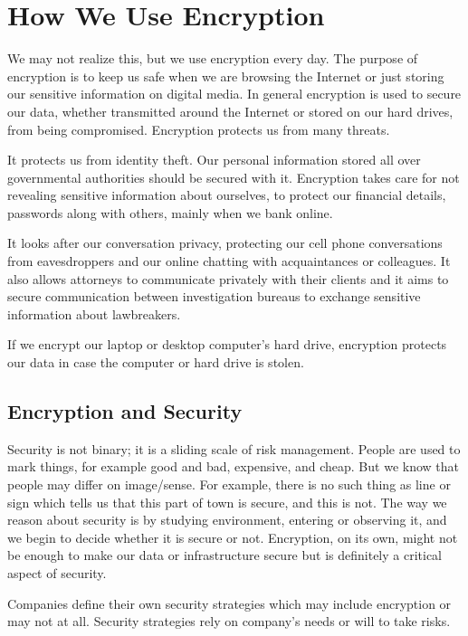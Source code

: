 \chapter{How We Use Encryption}\label{encryption}

We may not realize this, but we use encryption every day.
The purpose of encryption is to keep us safe when we are browsing the Internet or just storing our sensitive information on digital media.
In general encryption is used to secure our data, whether transmitted around the Internet or stored on our hard drives, from being compromised.
Encryption protects us from many threats.

It protects us from identity theft.
Our personal information stored all over governmental authorities should be secured with it.
Encryption takes care for not revealing sensitive information about ourselves, to protect our financial details, passwords along with others, mainly when we bank online.

It looks after our conversation privacy, protecting our cell phone conversations from eavesdroppers and our online chatting with acquaintances or colleagues.
It also allows attorneys to communicate privately with their clients and it aims to secure communication between investigation bureaus to exchange sensitive information about lawbreakers.

If we encrypt our laptop or desktop computer's hard drive, encryption protects our data in case the computer or hard drive is stolen.



\section{Encryption and Security}

Security is not binary; it is a sliding scale of risk management.
People are used to mark things, for example good and bad, expensive, and cheap.
But we know that people may differ on image/sense.
For example, there is no such thing as line or sign which tells us that this part of town is secure, and this is not.
The way we reason about security is by studying environment, entering or observing it, and we begin to decide whether it is secure or not.
Encryption, on its own, might not be enough to make our data or infrastructure secure but is definitely a critical aspect of security.

Companies define their own security strategies which may include encryption or may not at all.
Security strategies rely on company's needs or will to take risks.

